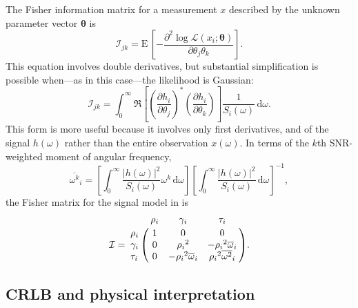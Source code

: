 \documentclass{iopart}
\begin{document}
The Fisher information matrix for a measurement $x$ described by the unknown parameter vector $\boldsymbol{\theta}$ is
%
\begin{equation}\label{eq:general-fisher-matrix}
	\mathcal{I}_{jk} = \mathrm{E} \, \left[
		-\frac{\partial^2 \log
			\mathcal{L}(x_i ; \boldsymbol\theta)}
			{\partial \theta_j \theta_k}
	\right].
\end{equation}
%
This equation involves double derivatives, but substantial simplification is possible when---as in this case---the likelihood is Gaussian:
%
\begin{equation}\label{eq:gaussian-fisher-matrix}
	\mathcal{I}_{jk} = \int_0^\infty \Re \left[
        \left(\frac{\partial h_i}{\partial \theta_j}\right)^*
        \left(\frac{\partial h_i}{\partial \theta_k}\right)
	\right] \frac{1}{S_i(\omega)} \, \mathrm{d}\omega.
\end{equation}
%
This form is more useful because it involves only first derivatives, and of the signal $h (\omega)$ rather than the entire observation $x (\omega)$. In terms of the $k$th \ac{SNR}-weighted moment of angular frequency,
%
\begin{equation}\label{eq:angular-frequency-moments}
    {\overline{\omega^k}}_i =
        \left[ \int_0^\infty \frac{|h (\omega)|^2}{S_i(\omega)} \omega^k \, \mathrm{d}\omega \right]
        \left[ \int_0^\infty \frac{|h (\omega)|^2}{S_i(\omega)} \, \mathrm{d}\omega \right]^{-1},
\end{equation}
%
the Fisher matrix for the signal model in  is
%
\begin{equation}\label{eq:fisher-matrix}
	\mathcal{I} = \bordermatrix{
        ~ & \rho_i & \gamma_i & \tau_i \cr
        \rho_i & 1 & 0 & 0 \cr
        \gamma_i & 0 & {\rho_i}^2 & -{\rho_i}^2 {\overline{\omega}}_i \cr
        \tau_i & 0 & -{\rho_i}^2 {\overline{\omega}}_i & {\rho_i}^2 {\overline{\omega^2}}_i
    }.
\end{equation}

\subsection{\ac{CRLB} and physical interpretation}
\end{document}
